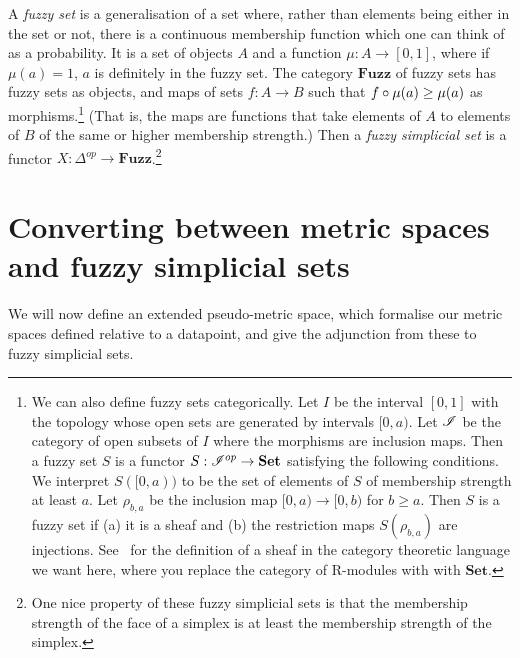 \documentclass[a4paper,11pt,leqno]{article} \usepackage{amsmath}
\theoremstyle{definition} \newtheorem{defn}{Definition}
\begin{document}
A \emph{fuzzy set} is a generalisation of a set where, rather than elements
being either in the set or not, there is a continuous membership function which
one can think of as a probability.  It is a set of objects $A$ and a function
$\mu: A\to [0, 1]$, where if $\mu(a) = 1$, $a$ is definitely in the fuzzy set.
The category $\textbf{Fuzz}$ of fuzzy sets has fuzzy sets as objects, and maps
of sets $f: A\to B$ such that $f\circ \mu(a) \geq \mu(a)$ as morphisms.\footnote{
  We can also define fuzzy sets categorically. Let $I$ be the interval $[0, 1]$
  with the topology whose open sets are generated by intervals $[0, a)$.  Let
  $\mathscr{I}$ be the category of open subsets of $I$ where the morphisms are
  inclusion maps.  Then a fuzzy set $S$ is a functor $S: \mathscr{I}^{op}\to
  \textbf{Set}$ satisfying the following conditions. We interpret $S([0, a))$ to
  be the set of elements of $S$ of membership strength at least $a$. Let
  $\rho_{b, a}$ be the inclusion map $[0, a)\to [0, b)$ for $b\geq a$. Then $S$
  is a fuzzy set if (a) it is a sheaf and (b) the restriction maps $S(\rho_{b,
  a})$ are injections. See~\cite{Weng} for the definition of a sheaf in the
  category theoretic language we want here, where you replace the category of
  R-modules with with $\textbf{Set}$.} (That is, the maps are functions that
take elements of $A$ to elements of $B$ of the same or higher membership
strength.) Then a \emph{fuzzy simplicial set} is a functor $X: \Delta^{op}\to
\textbf{Fuzz}$.\footnote{ One nice property of these fuzzy simplicial sets is
that the membership strength of the face of a simplex is at least the membership
strength of the simplex.}

\section{Converting between metric spaces and fuzzy simplicial sets}
\label{section_adjunction}

We will now define an extended pseudo-metric space, which formalise our metric
spaces defined relative to a datapoint, and give the adjunction from
these to fuzzy simplicial sets.
\end{document}
